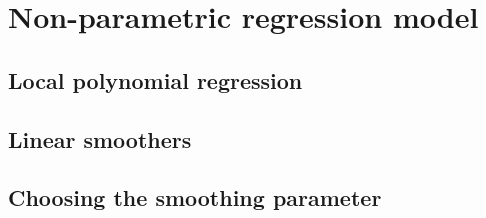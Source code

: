 \chapter{Non-parametric regression model}

\section{Local polynomial regression}
\section{Linear smoothers}
\section{Choosing the smoothing parameter}
